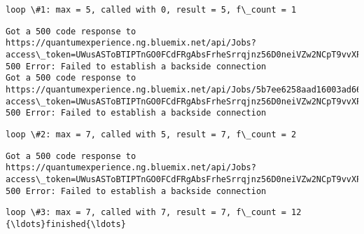 \documentclass[11pt]{article}
\begin{document}
    \begin{Verbatim}[commandchars=\\\{\}]
loop \#1: max = 5, called with 0, result = 5, f\_count = 1

    \end{Verbatim}

    \begin{Verbatim}[commandchars=\\\{\}]
Got a 500 code response to https://quantumexperience.ng.bluemix.net/api/Jobs?access\_token=UWusASToBTIPTnGO0FCdFRgAbsFrheSrrqjnz56D0neiVZw2NCpT9vvXPG49OL3p: 500 Error: Failed to establish a backside connection
Got a 500 code response to https://quantumexperience.ng.bluemix.net/api/Jobs/5b7ee6258aad16003ad6608c?access\_token=UWusASToBTIPTnGO0FCdFRgAbsFrheSrrqjnz56D0neiVZw2NCpT9vvXPG49OL3p: 500 Error: Failed to establish a backside connection

    \end{Verbatim}

    \begin{Verbatim}[commandchars=\\\{\}]
loop \#2: max = 7, called with 5, result = 7, f\_count = 2

    \end{Verbatim}

    \begin{Verbatim}[commandchars=\\\{\}]
Got a 500 code response to https://quantumexperience.ng.bluemix.net/api/Jobs?access\_token=UWusASToBTIPTnGO0FCdFRgAbsFrheSrrqjnz56D0neiVZw2NCpT9vvXPG49OL3p: 500 Error: Failed to establish a backside connection

    \end{Verbatim}

    \begin{Verbatim}[commandchars=\\\{\}]
loop \#3: max = 7, called with 7, result = 7, f\_count = 12
{\ldots}finished{\ldots}

    \end{Verbatim}


    
    
    
    
\end{document}

